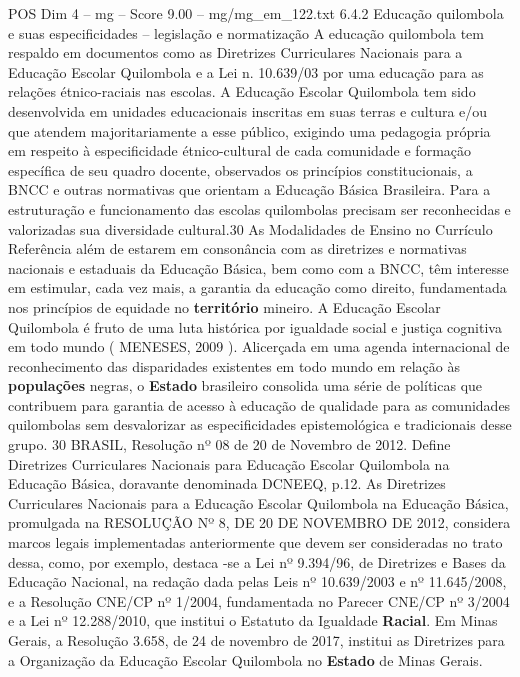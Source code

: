 \begin{textsample}{POS Dim 4 – mg – Score 9.00 – mg/mg\_em\_122.txt}  \label{ex:f4_pos_198}
6.4.2 Educação quilombola e suas especificidades – legislação e normatização A educação quilombola tem respaldo em documentos como as Diretrizes Curriculares Nacionais para a Educação Escolar Quilombola e a Lei n. 10.639/03 por uma educação para as relações étnico-raciais nas escolas.
A Educação Escolar Quilombola tem sido desenvolvida em unidades educacionais inscritas em suas terras e cultura e/ou que atendem majoritariamente a esse público, exigindo uma pedagogia própria em respeito à especificidade étnico-cultural de cada comunidade e formação específica de seu quadro docente, observados os princípios constitucionais, a BNCC e outras normativas que orientam a Educação Básica Brasileira.
Para a estruturação e funcionamento das escolas quilombolas precisam ser reconhecidas e valorizadas sua diversidade cultural.30 As Modalidades de Ensino no Currículo Referência além de estarem em consonância com as diretrizes e normativas nacionais e estaduais da Educação Básica, bem como com a BNCC, têm interesse em estimular, cada vez mais, a garantia da educação como direito, fundamentada nos princípios de equidade no \textbf{território} mineiro.
A Educação Escolar Quilombola é fruto de uma luta histórica por igualdade social e justiça cognitiva em todo mundo ( MENESES, 2009 ).
Alicerçada em uma agenda internacional de reconhecimento das disparidades existentes em todo mundo em relação às \textbf{populações} negras, o \textbf{Estado} brasileiro consolida uma série de políticas que contribuem para garantia de acesso à educação de qualidade para as comunidades quilombolas sem desvalorizar as especificidades epistemológica e tradicionais desse grupo. 30 BRASIL, Resolução nº 08 de 20 de Novembro de 2012.
Define Diretrizes Curriculares Nacionais para Educação Escolar Quilombola na Educação Básica, doravante denominada DCNEEQ, p.12.
As Diretrizes Curriculares Nacionais para a Educação Escolar Quilombola na Educação Básica, promulgada na RESOLUÇÃO Nº 8, DE 20 DE NOVEMBRO DE 2012, considera marcos legais implementadas anteriormente que devem ser consideradas no trato dessa, como, por exemplo, destaca -se a Lei nº 9.394/96, de Diretrizes e Bases da Educação Nacional, na redação dada pelas Leis nº 10.639/2003 e nº 11.645/2008, e a Resolução CNE/CP nº 1/2004, fundamentada no Parecer CNE/CP nº 3/2004 e a Lei nº 12.288/2010, que institui o Estatuto da Igualdade \textbf{Racial}.
Em Minas Gerais, a Resolução 3.658, de 24 de novembro de 2017, institui as Diretrizes para a Organização da Educação Escolar Quilombola no \textbf{Estado} de Minas Gerais.

\end{textsample}
